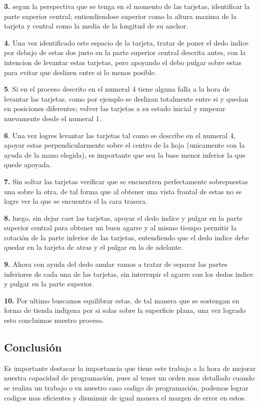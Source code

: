 \documentclass{article}
\begin{document}
\textbf{3.} segun la perspectiva que se tenga en el momento de las tarjetas, identificar la parte superior central; entiendiendose superior como la altura maxima de la tarjeta y central como la media de la longitud de su anchor.


\textbf{4.} Una vez identificado este espacio de la tarjeta, tratar de poner el dedo indice por debajo de estas dos justo en la parte superior central descrita antes, con la intencion de levantar estas tarjetas, pero apoyando el debo pulgar sobre estas para evitar que deslizen entre si lo menos posible.


\textbf{5}. Si en el proceso descrito en el numeral 4 tiene alguna falla a la hora de levantar las tarjetas, como por ejemplo se deslizan totalmente entre si y quedan en posiciones diferentes; volver las tarjetas a su estado inicial y empezar nuevamente desde el numeral 1.


\textbf{6}. Una vez logres levantar las tarjetas tal como se describe en el numeral 4, apoyar estas perpendicularmente sobre el centro de la hoja (unicamente con la ayuda de la mano elegida), es importante que sea la base menor inferior la que quede apoyada.


\textbf{7. } Sin soltar las tarjetas verificar que se encuentren perfectamente sobrepuestas una sobre la otra, de tal forma que al obtener una vista frontal de estas no se logre ver la que se encuentra el la cara trasera.


\textbf{8.} luego, sin dejar caer las tarjetas, apoyar el dedo indice y pulgar en la parte superior central para obtener un buen agarre y al mismo tiempo permitir la rotación de la parte inferior de las tarjetas, entendiendo que el dedo indice debe quedar en la tarjeta de atras y el pulgar en la de adelante.


\textbf{9.} Ahora con ayuda del dedo anular vamos a tratar de separar las partes inferiores de cada una de las tarjetas, sin interrupir el agarre con los dedos indice y pulgar en la parte superior. 


\textbf{10.} Por ultimo buscamos equilibrar estas, de tal manera que se sostengan en forma de tienda indigena por si solas sobre la superficie plana, una vez logrado esto concluimos nuestro proceso.

\vspace{2cm}

\subsection{Conclusión}
Es importante destacar la importancia que tiene este trabajo a la hora de mejorar nuestra capacidad de programación, pues al tener un orden mas detallado cuando se realiza un trabajo o en nuestro caso codigo de programación, podemos lograr codigos mas eficientes y disminuir de igual manera el margen de error en estos. 
\end{document}
